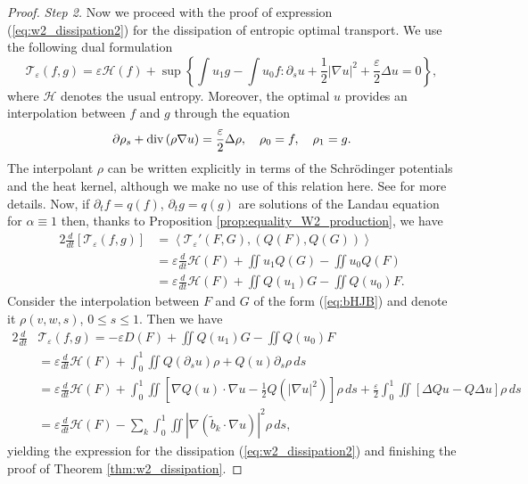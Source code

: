 \documentclass[11pt]{amsart}
\numberwithin{equation}{section}
\begin{document}
\begin{proof}
\noindent\textit{Step 2.} Now we proceed with the proof of expression (\ref{eq:w2_dissipation2}) for the dissipation of entropic optimal transport. We use the following dual formulation 
% 
\begin{equation*}
  \mathcal{T}_{\varepsilon}(f,g)=\varepsilon \mathcal H(f)+\sup\left\{ \int u_{1}g-\int u_{0}f:\partial_{s}u+\frac{1}{2}\left|\nabla u\right|^{2}+\frac{\varepsilon}{2}\Delta u=0\right\} ,
\end{equation*}
%
where $\mathcal H$ denotes the usual entropy. Moreover, the optimal $u$ provides an interpolation between $f$ and $g$ through the equation
%
\begin{equation}\label{eq:bHJB}
  \partial\rho_{s}+\textnormal{div}\left(\rho\nabla u\right)=\frac{\varepsilon}{2}\Delta\rho,\quad\rho_{0}=f,\quad\rho_{1}=g.
\end{equation}
%
The interpolant $\rho$ can be written explicitly in terms of the Schrödinger potentials and the heat kernel, although we make no use of this relation here. See \cite{gigli2020benamou} for more details. Now, if $\partial_tf=q(f)$, $\partial_tg=q(g)$ are solutions of the Landau equation for $\alpha \equiv 1$ then, thanks to Proposition \ref{prop:equality_W2_production}, we have
% 
\begin{align*}
    2\frac{d}{dt}\left[\mathcal T_{\varepsilon}(f,g)\right] & =\left\langle \mathcal T_{\varepsilon}'(F,G),\left(Q(F),Q(G)\right)\right\rangle \\
    & =\varepsilon\frac{d}{dt}\mathcal H(F)+\iint u_{1}Q(G)-\iint u_{0}Q(F)\\
    & =\varepsilon\frac{d}{dt}\mathcal H(F)+\iint Q(u_{1})G-\iint Q(u_{0})F.
\end{align*}
% 
Consider the interpolation between $F$ and $G$ of the form (\ref{eq:bHJB}) and denote it $\rho(v,w,s)$, $0\leq s\leq1$. Then we have
% 
\begin{align*}
    2\frac{d}{dt} & \mathcal T_{\varepsilon} (f,g)  
    = -\varepsilon D(F) +\iint Q(u_{1})G
    -\iint Q(u_{0})F\\
    & =\varepsilon\frac{d}{dt}\mathcal H(F)+ \int_{0}^{1}\iint Q(\partial_{s}u)\rho+Q(u)\partial_{s}\rho\,ds\\
    & =\varepsilon\frac{d}{dt}\mathcal H(F)+ \int_{0}^{1}\iint\left[\nabla Q(u)\cdot\nabla u-\frac{1}{2}Q(\left|\nabla u\right|^{2})\right]\rho\,ds
    +\frac{\varepsilon}{2}\int_{0}^{1}\iint\left[\Delta Qu-Q\Delta u\right]\rho\,ds\\
    & =\varepsilon\frac{d}{dt}\mathcal H(F)-\sum_{k}\int_{0}^{1}\iint\left|\nabla\left(\tilde{b}_{k}\cdot\nabla u\right)\right|^{2}\rho\,ds,
\end{align*}
yielding the expression for the dissipation (\ref{eq:w2_dissipation2}) and finishing the proof of Theorem \ref{thm:w2_dissipation}.

\end{proof}
\end{document}
